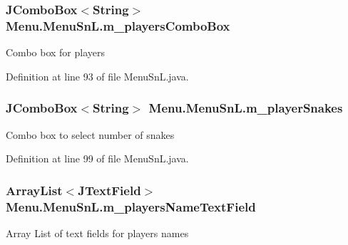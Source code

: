 \hypertarget{class_menu_1_1_menu_sn_l_a52b5fdac24b1860a453eee6f505208da}{}
\subsubsection[{m\+\_\+players\+Combo\+Box}]{\setlength{\rightskip}{0pt plus 5cm}J\+Combo\+Box$<$String$>$ Menu.\+Menu\+Sn\+L.\+m\+\_\+players\+Combo\+Box\hspace{0.3cm}{\ttfamily [private]}}\label{class_menu_1_1_menu_sn_l_a52b5fdac24b1860a453eee6f505208da}
Combo box for players 

Definition at line 93 of file Menu\+Sn\+L.\+java.

\hypertarget{class_menu_1_1_menu_sn_l_acc735c8e538c308d888618f726ddd344}{}
\subsubsection[{m\+\_\+player\+Snakes}]{\setlength{\rightskip}{0pt plus 5cm}J\+Combo\+Box$<$String$>$ Menu.\+Menu\+Sn\+L.\+m\+\_\+player\+Snakes\hspace{0.3cm}{\ttfamily [private]}}\label{class_menu_1_1_menu_sn_l_acc735c8e538c308d888618f726ddd344}
Combo box to select number of snakes 

Definition at line 99 of file Menu\+Sn\+L.\+java.

\hypertarget{class_menu_1_1_menu_sn_l_a8e5b5896ffe07afef10443fe99b45dab}{}
\subsubsection[{m\+\_\+players\+Name\+Text\+Field}]{\setlength{\rightskip}{0pt plus 5cm}Array\+List$<$J\+Text\+Field$>$ Menu.\+Menu\+Sn\+L.\+m\+\_\+players\+Name\+Text\+Field\hspace{0.3cm}{\ttfamily [private]}}\label{class_menu_1_1_menu_sn_l_a8e5b5896ffe07afef10443fe99b45dab}
Array List of text fields for player\textquotesingle{}s names 

